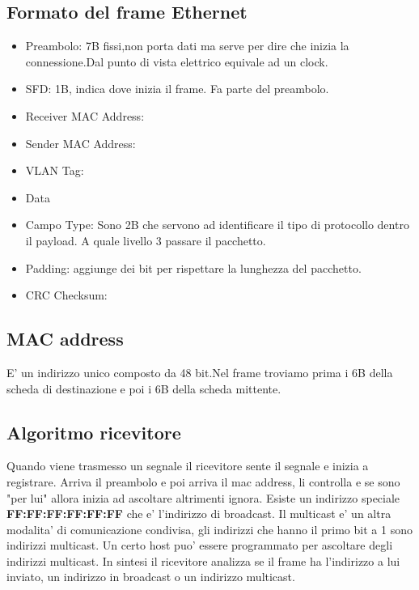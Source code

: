 \subsection{Formato del frame Ethernet}
\begin{itemize}
  \item Preambolo: 7B fissi,non porta dati ma serve per dire che inizia la connessione.Dal punto di vista elettrico equivale ad un clock.
  \item SFD: 1B, indica dove inizia il frame. Fa parte del preambolo.
  \item Receiver MAC Address: 
  \item Sender MAC Address:
  \item VLAN Tag:
  \item Data
  \item Campo Type: Sono 2B che servono ad identificare il tipo di protocollo dentro il payload. A quale livello 3 passare il pacchetto. 
  \item Padding: aggiunge dei bit per rispettare la lunghezza del pacchetto.
  \item CRC Checksum:
\end{itemize}
\subsection{MAC address}
E' un indirizzo unico composto da 48 bit.Nel frame troviamo prima i 6B della scheda di destinazione e poi i 6B della scheda mittente.
\subsection{Algoritmo ricevitore}
Quando viene trasmesso un segnale il ricevitore sente il segnale e inizia a registrare. Arriva il preambolo e poi arriva il mac address, li controlla e se sono "per lui" allora inizia ad ascoltare altrimenti ignora. Esiste un indirizzo speciale \textbf{FF:FF:FF:FF:FF:FF} che e' l'indirizzo di broadcast. Il multicast e' un altra modalita' di comunicazione condivisa, gli indirizzi che hanno il primo bit a 1 sono indirizzi multicast. Un certo host puo' essere programmato per ascoltare degli indirizzi multicast. In sintesi il ricevitore analizza se il frame ha l'indirizzo a lui inviato, un indirizzo in broadcast o un indirizzo multicast.
